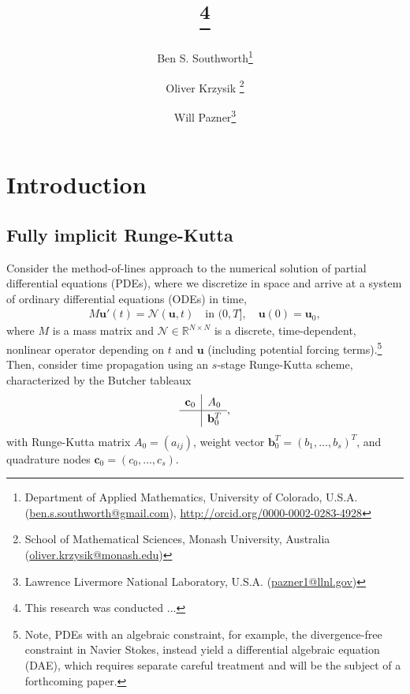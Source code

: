 \documentclass[review]{siamart}
\title{{\TheTitle}\thanks{This research was conducted ...
  }}
\author{Ben S. Southworth\thanks{Department of Applied Mathematics,
    University of Colorado,
    U.S.A. (\url{ben.s.southworth@gmail.com}),
    \url{http://orcid.org/0000-0002-0283-4928}}
    \and
    Oliver Krzysik
  	\thanks{School of Mathematical Sciences, Monash University,
  	Australia (\url{oliver.krzysik@monash.edu})}
  	\and
  	Will Pazner\thanks{Lawrence Livermore National Laboratory,
    U.S.A. (\url{pazner1@llnl.gov})}
}
\begin{document}
\maketitle
\allowdisplaybreaks

\begin{abstract}

\end{abstract}


\section{Introduction}\label{sec:intro}

\subsection{Fully implicit Runge-Kutta}\label{sec:intro:irk}

Consider the method-of-lines approach to the numerical solution of partial differential
equations (PDEs), where we discretize in space and arrive at a system of ordinary
differential equations (ODEs) in time,
%
\begin{align}\label{eq:problem}
	M\mathbf{u}'(t) =  \mathcal{N}(\mathbf{u},t) \quad\text{in }(0,T], \quad \mathbf{u}(0) = \mathbf{u}_0,
\end{align}
%
where $M$ is a mass matrix and $\mathcal{N}\in\mathbb{R}^{N\times N}$ is a discrete, time-dependent, nonlinear operator depending on $t$ and $\mathbf{u}$ (including potential
forcing terms).\footnote{Note, PDEs with an algebraic constraint, for example, the divergence-free
constraint in Navier Stokes, instead yield a differential algebraic equation (DAE), which
requires separate careful treatment and will be the subject of a forthcoming paper.}
Then, consider time propagation using an $s$-stage Runge-Kutta scheme,
characterized by the Butcher tableaux 
%
\begin{align*}
	\renewcommand\arraystretch{1.2}
	\begin{array}
	{c|c}
	\mathbf{c}_0 & A_0\\
	\hline
	& \mathbf{b}_0^T
	\end{array},
\end{align*}
%
with Runge-Kutta matrix $A_0 = (a_{ij})$, weight vector $\mathbf{b}_0^T = (b_1, \ldots, b_s)^T$,
and quadrature nodes $\mathbf{c}_0 = (c_0, \ldots, c_s)$.
\end{document}
